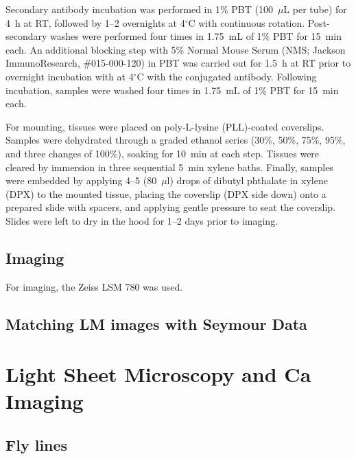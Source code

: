     Secondary antibody incubation was performed in 1\% PBT (100~$\mu$L per tube) for 4~h at RT, followed by 1--2 overnights at 4$^\circ$C with continuous rotation. Post-secondary washes were performed four times in 1.75~mL of 1\% PBT for 15~min each. An additional blocking step with 5\% Normal Mouse Serum (NMS; Jackson ImmunoResearch, \#015-000-120) in PBT was carried out for 1.5~h at RT prior to overnight incubation with at 4$^\circ$C with the conjugated antibody. Following incubation, samples were washed four times in 1.75~mL of 1\% PBT for 15~min each.  

    For mounting, tissues were placed on poly-L-lysine (PLL)-coated coverslips. Samples were dehydrated through a graded ethanol series (30\%, 50\%, 75\%, 95\%, and three changes of 100\%), soaking for 10~min at each step. Tissues were cleared by immersion in three sequential 5~min xylene baths. Finally, samples were embedded by applying 4--5 (80~$\mu$l) drops of dibutyl phthalate in xylene (DPX) to the mounted tissue, placing the coverslip (DPX side down) onto a prepared slide with spacers, and applying gentle pressure to seat the coverslip. Slides were left to dry in the hood for 1--2 days prior to imaging.

\subsection{Imaging}
    For imaging, the Zeiss LSM 780 was used.

\subsection{Matching LM images with Seymour Data} %










\section{Light Sheet Microscopy and Ca Imaging}

\subsection{Fly lines} %

